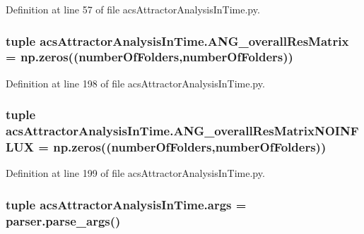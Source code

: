 Definition at line 57 of file acs\-Attractor\-Analysis\-In\-Time.\-py.

\hypertarget{a00092_a15adfffa273548845cea67d8b89f0bb1}{
\subsubsection[{A\-N\-G\-\_\-overall\-Res\-Matrix}]{\setlength{\rightskip}{0pt plus 5cm}tuple acs\-Attractor\-Analysis\-In\-Time.\-A\-N\-G\-\_\-overall\-Res\-Matrix = np.\-zeros(({\bf number\-Of\-Folders},{\bf number\-Of\-Folders}))}}\label{a00092_a15adfffa273548845cea67d8b89f0bb1}


Definition at line 198 of file acs\-Attractor\-Analysis\-In\-Time.\-py.

\hypertarget{a00092_a7b0e67be0cf8de69432bdf56919d9e33}{
\subsubsection[{A\-N\-G\-\_\-overall\-Res\-Matrix\-N\-O\-I\-N\-F\-L\-U\-X}]{\setlength{\rightskip}{0pt plus 5cm}tuple acs\-Attractor\-Analysis\-In\-Time.\-A\-N\-G\-\_\-overall\-Res\-Matrix\-N\-O\-I\-N\-F\-L\-U\-X = np.\-zeros(({\bf number\-Of\-Folders},{\bf number\-Of\-Folders}))}}\label{a00092_a7b0e67be0cf8de69432bdf56919d9e33}


Definition at line 199 of file acs\-Attractor\-Analysis\-In\-Time.\-py.

\hypertarget{a00092_ab6621347b1ac2fe0e436bd2f384af8dc}{
\subsubsection[{args}]{\setlength{\rightskip}{0pt plus 5cm}tuple acs\-Attractor\-Analysis\-In\-Time.\-args = parser.\-parse\-\_\-args()}}\label{a00092_ab6621347b1ac2fe0e436bd2f384af8dc}


